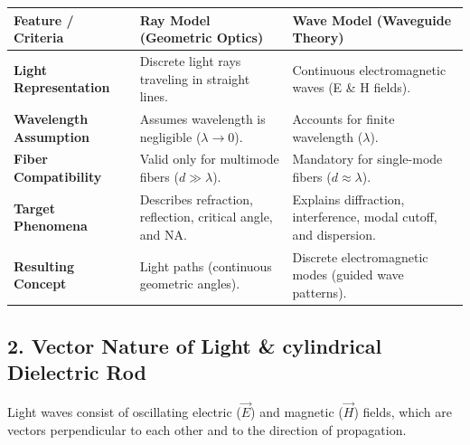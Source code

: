 \begin{table}[H]
\centering
\begin{tabular}{|p{}|p{}|p{}|}
\hline
Feature / Criteria & Ray Model (Geometric Optics) & Wave Model (Waveguide Theory) \\
\hline
\textbf{Light Representation} & Discrete light rays traveling in straight lines. & Continuous electromagnetic waves (E \& H fields). \\
\hline
\textbf{Wavelength Assumption} & Assumes wavelength is negligible ($\lambda \to 0$). & Accounts for finite wavelength ($\lambda$). \\
\hline
\textbf{Fiber Compatibility} & Valid only for multimode fibers ($d \gg \lambda$). & Mandatory for single-mode fibers ($d \approx \lambda$). \\
\hline
\textbf{Target Phenomena} & Describes refraction, reflection, critical angle, and NA. & Explains diffraction, interference, modal cutoff, and dispersion. \\
\hline
\textbf{Resulting Concept} & Light paths (continuous geometric angles). & Discrete electromagnetic modes (guided wave patterns). \\
\hline
\end{tabular}
\end{table}


\subsection{2. Vector Nature of Light \& cylindrical Dielectric Rod}
Light waves consist of oscillating electric ($\vec{E}$) and magnetic ($\vec{H}$) fields, which are vectors perpendicular to each other and to the direction of propagation.

